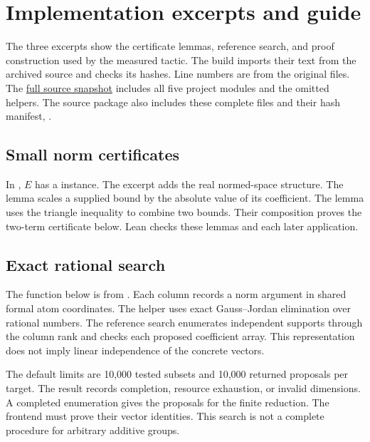 \clearpage
\section{Implementation excerpts and guide}
\label{app:implementation}

The three excerpts show the certificate lemmas, reference search, and proof construction used by the measured tactic.
The build imports their text from the archived source and checks its hashes.
Line numbers are from the original files.
The \href{https://github.com/TomasOrtega/norm-arith/tree/0f9b637e6f3f385e8ffa7c8a6135beb0e9c6fdc2}{full source snapshot} includes all five project modules and the omitted helpers.
The source package also includes these complete files and their hash manifest, .

\subsection{Small norm certificates}
In , $E$ has a  instance.
The excerpt adds the real normed-space structure.
The lemma  scales a supplied bound by the absolute value of its coefficient.
The lemma  uses the triangle inequality to combine two bounds.
Their composition proves the two-term certificate below.
Lean checks these lemmas and each later application.



\subsection{Exact rational search}
The function below is from .
Each column records a norm argument in shared formal atom coordinates.
The helper  uses exact Gauss--Jordan elimination over rational numbers.
The reference search enumerates independent supports through the column rank and checks each proposed coefficient array.
This representation does not imply linear independence of the concrete vectors.

The default limits are 10,000 tested subsets and 10,000 returned proposals per target.
The result records completion, resource exhaustion, or invalid dimensions.
A completed enumeration gives the proposals for the finite reduction.
The frontend must prove their vector identities.
This search is not a complete procedure for arbitrary additive groups.

